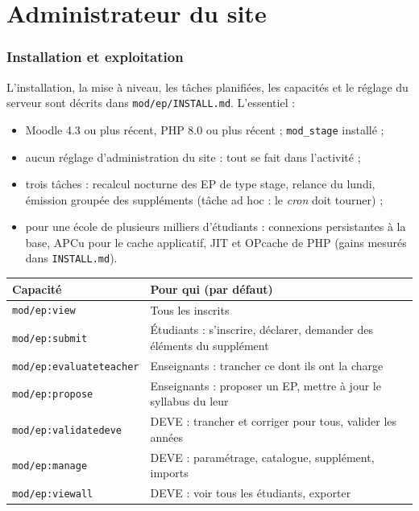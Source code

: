 \documentclass[11pt,a4paper]{article}
\begin{document}

\newpage
\part{Administrateur du site}\label{part:admin}

\section{Installation et exploitation}

L'installation, la mise à niveau, les tâches planifiées, les capacités et le réglage du
serveur sont décrits dans \texttt{mod/ep/INSTALL.md}. L'essentiel :
\begin{itemize}
  \item Moodle 4.3 ou plus récent, PHP 8.0 ou plus récent ; \texttt{mod\_stage} installé ;
  \item aucun réglage d'administration du site : tout se fait dans l'activité ;
  \item trois tâches : recalcul nocturne des EP de type stage, relance du lundi, émission
    groupée des suppléments (tâche ad hoc : le \emph{cron} doit tourner) ;
  \item pour une école de plusieurs milliers d'étudiants : connexions persistantes à la base,
    APCu pour le cache applicatif, JIT et OPcache de PHP (gains mesurés dans
    \texttt{INSTALL.md}).
\end{itemize}

\begin{center}
\begin{tabularx}{\linewidth}{@{}l X@{}}
\toprule
\textbf{Capacité} & \textbf{Pour qui (par défaut)} \\
\midrule
\texttt{mod/ep:view} & Tous les inscrits \\
\texttt{mod/ep:submit} & Étudiants : s'inscrire, déclarer, demander des éléments du
supplément \\
\texttt{mod/ep:evaluateteacher} & Enseignants : trancher ce dont ils ont la charge \\
\texttt{mod/ep:propose} & Enseignants : proposer un EP, mettre à jour le syllabus du leur \\
\texttt{mod/ep:validatedeve} & DEVE : trancher et corriger pour tous, valider les années \\
\texttt{mod/ep:manage} & DEVE : paramétrage, catalogue, supplément, imports \\
\texttt{mod/ep:viewall} & DEVE : voir tous les étudiants, exporter \\
\bottomrule
\end{tabularx}
\end{center}
\end{document}
